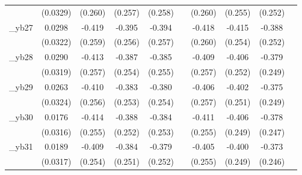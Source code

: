 \begin{table}[htbp]
\begin{tabular}{l*{9}{c}}
            &    (0.0329)         &     (0.260)         &     (0.257)         &     (0.258)         &                     &     (0.260)         &     (0.255)         &     (0.252)         &                     \\
[1em]
\_yb27       &      0.0298         &      -0.419         &      -0.395         &      -0.394         &                     &      -0.418         &      -0.415         &      -0.388         &                     \\
            &    (0.0322)         &     (0.259)         &     (0.256)         &     (0.257)         &                     &     (0.260)         &     (0.254)         &     (0.252)         &                     \\
[1em]
\_yb28       &      0.0290         &      -0.413         &      -0.387         &      -0.385         &                     &      -0.409         &      -0.406         &      -0.379         &                     \\
            &    (0.0319)         &     (0.257)         &     (0.254)         &     (0.255)         &                     &     (0.257)         &     (0.252)         &     (0.249)         &                     \\
[1em]
\_yb29       &      0.0263         &      -0.410         &      -0.383         &      -0.380         &                     &      -0.406         &      -0.402         &      -0.375         &                     \\
            &    (0.0324)         &     (0.256)         &     (0.253)         &     (0.254)         &                     &     (0.257)         &     (0.251)         &     (0.249)         &                     \\
[1em]
\_yb30       &      0.0176         &      -0.414         &      -0.388         &      -0.384         &                     &      -0.411         &      -0.406         &      -0.378         &                     \\
            &    (0.0316)         &     (0.255)         &     (0.252)         &     (0.253)         &                     &     (0.255)         &     (0.249)         &     (0.247)         &                     \\
[1em]
\_yb31       &      0.0189         &      -0.409         &      -0.384         &      -0.379         &                     &      -0.405         &      -0.400         &      -0.373         &                     \\
            &    (0.0317)         &     (0.254)         &     (0.251)         &     (0.252)         &                     &     (0.255)         &     (0.249)         &     (0.246)         &                     \\

\end{tabular}
\end{table}
